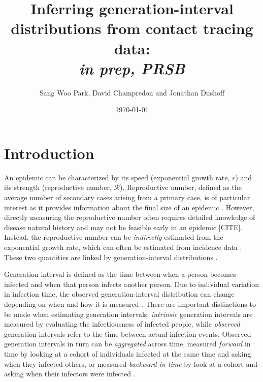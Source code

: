 \documentclass[12pt]{article}
\title{Inferring generation-interval distributions from contact tracing data: \\ \emph{in prep, PRSB}}
\author{Sang Woo Park, David Champredon and Jonathan Dushoff}
\date{\today}
\newcommand{\RR}{\ensuremath{{\mathcal R}}}
\begin{document}
\maketitle

\section{Introduction}

An epidemic can be characterized by its speed (exponential growth rate, $r$) and its strength (reproductive number, \RR).
Reproductive number, defined as the average number of secondary cases arising from a primary case, is of particular interest as it provides information about the final size of an epidemic \citep{anderson1991infectious, diekmann1990definition}.
However, directly measuring the reproductive number often requires detailed knowledge of disease natural history and may not be feasible early in an epidemic [CITE].
Instead, the reproductive number can be \emph{indirectly} estimated from the exponential growth rate, which can often be estimated from incidence data \citep{mills2004transmissibility, nishiura2009transmission, ma2014estimating}.
These two quantities are linked by generation-interval distributions \citep{wallinga2007generation, park2019practical}.

Generation interval is defined as the time between when a person becomes infected and when that person infects another person.
Due to individual variation in infection time, the observed generation-interval distribution can change depending on when and how it is measured \citep{svensson2007note, kenah2008generation, nishiura2010time, champredon2015intrinsic}.
There are important distinctions to be made when estimating generation intervals: \emph{intrinsic} generation intervals are measured by evaluating the infectiousness of infected people,
while \emph{observed} generation intervals refer to the time between actual infection events.
Observed generation intervals in turn can be \emph{aggregated} across time, measured \emph{forward} in time by looking at a cohort of individuals infected at the same time and asking when they infected others, or measured \emph{backward in time} by look at a cohort and asking when their infectors were infected \citep{champredon2015intrinsic}.
\end{document}
